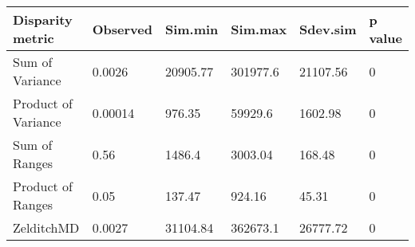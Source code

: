 
\begin{tabular}[t]{l l l l l l }		%
\hline
\textbf{Disparity metric} & \textbf{Observed} & \textbf{Sim.min} & \textbf{Sim.max} & \textbf{Sdev.sim} & \textbf{p value} \\
\hline
Sum of Variance & 0.0026 & 20905.77 & 301977.6 & 21107.56 &  0\\
Product of Variance	& 0.00014 &	976.35 &	59929.6 &	1602.98 &	0\\
Sum of Ranges &	0.56 &	1486.4 &	3003.04 & 	168.48 & 0 \\
Product of Ranges & 0.05 &	137.47 &	924.16 &	45.31 &	0\\
ZelditchMD & 0.0027 & 31104.84 &	362673.1 &	26777.72 &	0\\

\hline
\end{tabular}